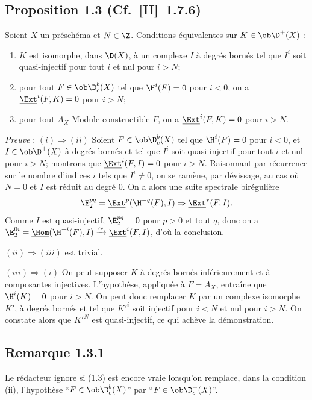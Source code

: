 \subsection*{Proposition 1.3 {\normalfont (Cf.~[H]~1.7.6)}}
Soient $X$ un préschéma et $N \in \Z$. Conditions équivalentes sur $K \in \ob \D^{+}(X)$ :
\begin{enumerate}[label=(\roman*)]
\item $K$ est isomorphe, dans $\D(X)$, à un complexe $I$ à degrés bornés tel que $I^i$ soit quasi-injectif pour tout $i$ et nul pour $i > N$;
\item pour tout $F \in \ob \D_c^{b}(X)$ tel que $\H^i(F) = 0$ pour $i < 0$, on a $\underline{\Ext}^i(F,K) = 0$ pour $i > N$;
\item pour tout $A_X$-Module constructible $F$, on a $\underline{\Ext}^i(F,K) = 0$ pour $i > N$.
\end{enumerate}

\emph{Preuve} : $(i) \Rightarrow (ii)$ Soient $F \in \ob \D_c^{b}(X)$ tel que $\H^i(F) = 0$ pour $i < 0$, et $I \in \ob \D^{+}(X)$ à degrés bornés et tel que $I^i$ soit quasi-injectif pour tout $i$ et nul pour $i > N$; montrons que $\underline{\Ext}^i(F,I) = 0$ pour $i > N$. Raisonnant par récurrence sur le nombre d'indices $i$ tels que $I^i \neq 0$, on se ramène, par dévissage, au cas où $N = 0$ et $I$ est réduit au degré $0$. On a alors une suite spectrale birégulière
\[
\E_2^{pq} = \underline{\Ext}^p(\H^{-q}(F),I) \Rightarrow \underline{\Ext}^{*}(F,I).
\]
Comme $I$ est quasi-injectif, $\E_2^{pq} = 0$ pour $p > 0$ et tout $q$, donc on a $\E_2^{0i} = \underline{\Hom}(\H^{-i}(F),I) \xrightarrow{\sim} \underline{\Ext}^i(F,I)$, d'où la conclusion.

$(ii) \Rightarrow (iii)$ est trivial.

$(iii) \Rightarrow (i)$ On peut supposer $K$ à degrés bornés inférieurement et à
composantes injectives. L'hypothèse, appliquée à $F = A_X$, entraîne que $\H^i(K) = 0$ pour $i > N$. On peut donc remplacer $K$ par un complexe isomorphe $K'$, à degrés bornés et tel que $K'^i$ soit injectif pour $i < N$ et nul pour $i > N$. On constate alors que $K'^N$ est quasi-injectif, ce qui achève la démonstration.

\subsection*{Remarque 1.3.1}
Le rédacteur ignore si (1.3) est encore vraie lorsqu'on remplace, dans la condition (ii), l'hypothèse ``$F \in \ob \D_c^{b}(X)$'' par ``$F \in \ob \D_c^{+}(X)$''.

